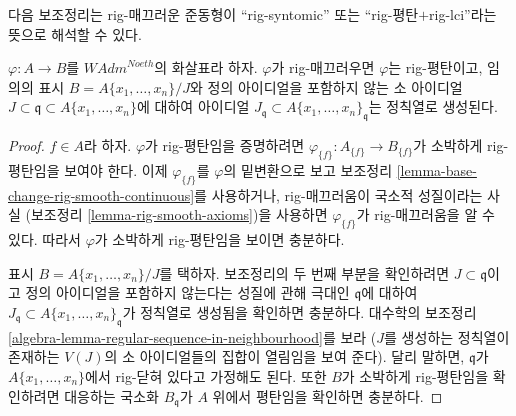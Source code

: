 \noindent
다음 보조정리는 rig-매끄러운 준동형이 ``rig-syntomic'' 또는
``rig-평탄$+$rig-lci''라는 뜻으로 해석할 수 있다.

\begin{lemma}
\label{lemma-rig-smooth-rig-flat}
$\varphi : A \to B$를 $\textit{WAdm}^{Noeth}$의 화살표라 하자.
$\varphi$가 rig-매끄러우면 $\varphi$는 rig-평탄이고, 임의의 표시
$B = A\{x_1, \ldots, x_n\}/J$와 정의 아이디얼을 포함하지 않는 소 아이디얼
$J \subset \mathfrak q \subset A\{x_1, \ldots, x_n\}$에 대하여 아이디얼
$J_\mathfrak q \subset A\{x_1, \ldots, x_n\}_\mathfrak q$는 정칙열로 생성된다.
\end{lemma}

\begin{proof}
$f \in A$라 하자. $\varphi$가 rig-평탄임을 증명하려면
$\varphi_{\{f\}} : A_{\{f\}} \to B_{\{f\}}$가 소박하게 rig-평탄임을
보여야 한다. 이제 $\varphi_{\{f\}}$를 $\varphi$의 밑변환으로 보고
보조정리 \ref{lemma-base-change-rig-smooth-continuous}를 사용하거나,
rig-매끄러움이 국소적 성질이라는 사실
(보조정리 \ref{lemma-rig-smooth-axioms})을 사용하면
$\varphi_{\{f\}}$가 rig-매끄러움을 알 수 있다. 따라서
$\varphi$가 소박하게 rig-평탄임을 보이면 충분하다.

\medskip\noindent
표시 $B = A\{x_1, \ldots, x_n\}/J$를 택하자.
보조정리의 두 번째 부분을 확인하려면 $J \subset \mathfrak q$이고
정의 아이디얼을 포함하지 않는다는 성질에 관해 극대인 $\mathfrak q$에 대하여
$J_\mathfrak q \subset A\{x_1, \ldots, x_n\}_\mathfrak q$가
정칙열로 생성됨을 확인하면 충분하다. 대수학의 보조정리
\ref{algebra-lemma-regular-sequence-in-neighbourhood}를 보라
($J$를 생성하는 정칙열이 존재하는 $V(J)$의 소 아이디얼들의 집합이
열림임을 보여 준다).
달리 말하면, $\mathfrak q$가 $A\{x_1, \ldots, x_n\}$에서
rig-닫혀 있다고 가정해도 된다. 또한 $B$가 소박하게 rig-평탄임을
확인하려면 대응하는 국소화 $B_\mathfrak q$가 $A$ 위에서 평탄임을
확인하면 충분하다.


\end{proof}
